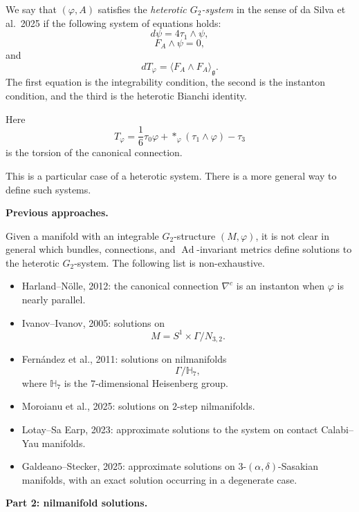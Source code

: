 \begin{definition}
\label{definition-say-satisfies}
We say that $(\varphi,A)$ satisfies
the {\it heterotic $G_2$-system}
in the sense of da Silva et al.\
2025
if the following system of equations
holds:
\[
        d\psi=4\tau_1\wedge\psi,
\]
\[
        F_A\wedge\psi=0,
\]
and
\[
        dT_\varphi
        =
        \langle F_A\wedge F_A
        \rangle_{\mathfrak g}.
\]
The first equation is the integrability
condition, the second is the
instanton condition, and the third is
the heterotic Bianchi identity.
\end{definition}

Here
\[
        T_\varphi
        =
        \frac{1}{6}\tau_0\varphi
        +
        *_\varphi(\tau_1\wedge\varphi)
        -
        \tau_3
\]
is the torsion of the canonical
connection.

\begin{remark}
\label{remark-particular-case}
This is a particular case of a
heterotic system.
There is a more general way to define
such systems.
\end{remark}

\medskip\noindent
{\bf Previous approaches.}

Given a manifold with an integrable
$G_2$-structure $(M,\varphi)$, it is
not clear in general which bundles,
connections, and
$\operatorname{Ad}$-invariant metrics
define solutions to the heterotic
$G_2$-system.
The following list is non-exhaustive.

\begin{itemize}
\item Harland--N\"olle, 2012:
the canonical connection $\nabla^c$
is an instanton when $\varphi$ is
nearly parallel.
\item Ivanov--Ivanov, 2005:
solutions on
\[
        M=S^1\times \Gamma/N_{3,2}.
\]
\item Fern\'andez et al., 2011:
solutions on nilmanifolds
\[
        \Gamma/\mathbb H_7,
\]
where $\mathbb H_7$ is the
$7$-dimensional Heisenberg group.
\item Moroianu et al., 2025:
solutions on $2$-step nilmanifolds.
\item Lotay--Sa Earp, 2023:
approximate solutions to the system
on contact Calabi--Yau manifolds.
\item Galdeano--Stecker, 2025:
approximate solutions on
$3$-$(\alpha,\delta)$-Sasakian
manifolds, with an exact solution
occurring in a degenerate case.
\end{itemize}

\medskip\noindent
{\bf Part 2: nilmanifold solutions.}

